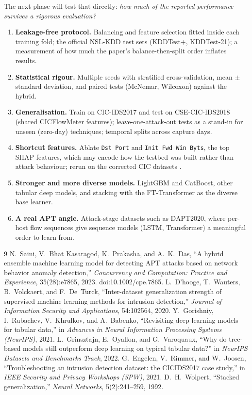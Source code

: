 \documentclass[11pt,a4paper]{article}
\begin{document}
The next phase will test that directly: \emph{how much of the reported performance survives a rigorous evaluation?}
\begin{enumerate}
  \item \textbf{Leakage-free protocol.} Balancing and feature selection fitted inside each training fold; the
        official NSL-KDD test sets (KDDTest+, KDDTest-21); a measurement of how much the paper's
        balance-then-split order inflates results.
  \item \textbf{Statistical rigour.} Multiple seeds with stratified cross-validation, mean $\pm$ standard deviation,
        and paired tests (McNemar, Wilcoxon) against the hybrid.
  \item \textbf{Generalisation.} Train on CIC-IDS2017 and test on CSE-CIC-IDS2018 (shared CICFlowMeter features);
        leave-one-attack-out tests as a stand-in for unseen (zero-day) techniques; temporal splits across capture days.
  \item \textbf{Shortcut features.} Ablate \texttt{Dst Port} and \texttt{Init Fwd Win Byts}, the top SHAP features,
        which may encode how the testbed was built rather than attack behaviour; rerun on the corrected CIC datasets
        \cite{engelen2021}.
  \item \textbf{Stronger and more diverse models.} LightGBM and CatBoost, other tabular deep models, and stacking with
        the FT-Transformer as the diverse base learner.
  \item \textbf{A real APT angle.} Attack-stage datasets such as DAPT2020, where per-host flow sequences give
        sequence models (LSTM, Transformer) a meaningful order to learn from.
\end{enumerate}

\begin{thebibliography}{9}
 N.~Saini, V.~Bhat Kasaragod, K.~Prakasha, and A.~K.~Das, ``A hybrid ensemble machine learning
model for detecting APT attacks based on network behavior anomaly detection,'' \emph{Concurrency and Computation:
Practice and Experience}, 35(28):e7865, 2023. doi:10.1002/cpe.7865.
 L.~D'hooge, T.~Wauters, B.~Volckaert, and F.~De~Turck, ``Inter-dataset generalization strength
of supervised machine learning methods for intrusion detection,'' \emph{Journal of Information Security and
Applications}, 54:102564, 2020.
 Y.~Gorishniy, I.~Rubachev, V.~Khrulkov, and A.~Babenko, ``Revisiting deep learning models for
tabular data,'' in \emph{Advances in Neural Information Processing Systems (NeurIPS)}, 2021.
 L.~Grinsztajn, E.~Oyallon, and G.~Varoquaux, ``Why do tree-based models still outperform deep
learning on typical tabular data?'' in \emph{NeurIPS Datasets and Benchmarks Track}, 2022.
 G.~Engelen, V.~Rimmer, and W.~Joosen, ``Troubleshooting an intrusion detection dataset: the
CICIDS2017 case study,'' in \emph{IEEE Security and Privacy Workshops (SPW)}, 2021.
 D.~H.~Wolpert, ``Stacked generalization,'' \emph{Neural Networks}, 5(2):241--259, 1992.
\end{thebibliography}
\end{document}
